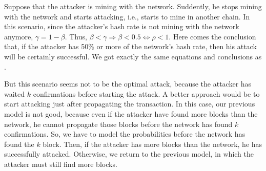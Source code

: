 Suppose that the attacker is mining with the network. Suddently, he stops mining with the network and starts attacking, i.e., starts to mine in another chain. In this scenario, since the attacker's hash rate is not mining with the network anymore, $\gamma = 1 - \beta$. Thus, $\beta < \gamma \Rightarrow \beta < 0.5 \Leftrightarrow \rho < 1$. Here comes the conclusion that, if the attacker has 50\% or more of the network's hash rate, then his attack will be certainly successful. We got exactly the same equations and conclusions as \cite{nakamoto2008bitcoin}.

But this scenario seems not to be the optimal attack, because the attacker has waited $k$ confirmations before starting the attack. A better approach would be to start attacking just after propagating the transaction. In this case, our previous model is not good, because even if the attacker have found more blocks than the network, he cannot propagate those blocks before the network has found $k$ confirmations. So, we have to model the probabilities before the network has found the $k$ block. Then, if the attacker has more blocks than the network, he has successfully attacked. Otherwise, we return to the previous model, in which the attacker must still find more blocks.


